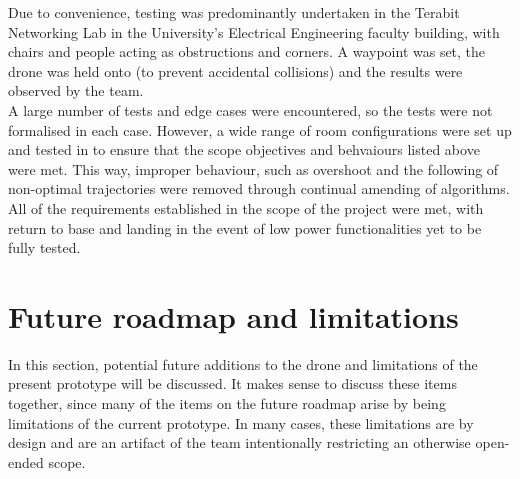 \documentclass[capstone_report.tex]{subfiles}
\begin{document}
Due to convenience, testing was predominantly undertaken in the Terabit Networking Lab in the University’s Electrical Engineering faculty building, with chairs and people acting as obstructions and corners. A waypoint was set, the drone was held onto (to prevent accidental collisions) and the results were observed by the team.\\

A large number of tests and edge cases were encountered, so the tests were not formalised in each case. However, a wide range of room configurations were set up and tested in to ensure that the scope objectives and behvaiours listed above were met. This way, improper behaviour, such as overshoot and the following of non-optimal trajectories were removed through continual amending of algorithms. All of the requirements established in the scope of the project were met, with return to base and landing in the event of low power functionalities yet to be fully tested.

\section{Future roadmap and limitations}
In this section, potential future additions to the drone and limitations of the present prototype will be discussed.  It makes sense to discuss these items together, since many of the items on the future roadmap arise by being limitations of the current prototype. In many cases, these limitations are by design and are an artifact of the team intentionally restricting an otherwise open-ended scope. \\
\end{document}
